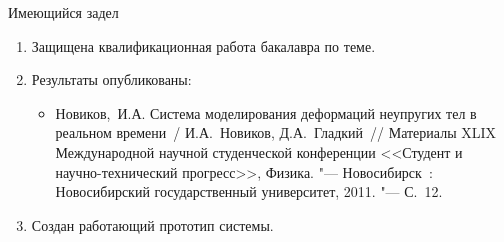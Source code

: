 \documentclass[usenames,dvipsnames,pdftex,unicode,hidelinks]{beamer}
\begin{document}
  \begin{frame}{Имеющийся задел}
    \begin{enumerate}
      \item Защищена квалификационная работа бакалавра по теме.
      \item Результаты опубликованы:
        \begin{itemize}
          \item
            Новиков,~И.А. Система моделирования деформаций неупругих тел в реальном времени~/
            И.А.~Новиков, Д.А.~Гладкий~// Материалы XLIX Международной научной студенческой
            конференции <<Студент и научно-технический прогресс>>, Физика. "--- Новосибирск~:
            Новосибирский государственный университет, 2011. "--- С.~12.
        \end{itemize}
      \item Создан работающий прототип системы.
    \end{enumerate}
  \end{frame}
\end{document}

